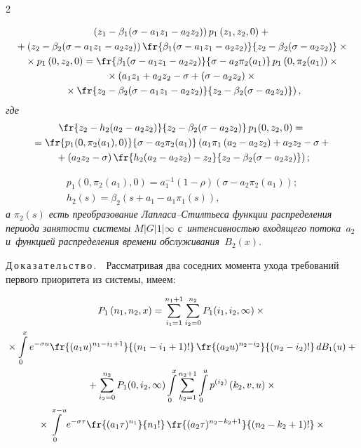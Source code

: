 \begin{multicols}{2}
\vspace*{-12pt}

\noindent
\begin{multline}
\label{n11}
\left(z_1-\beta_1(\sigma-a_1z_1-a_2z_2)\right)
p_1\left(z_1,z_2,0\right)+{}\\
{}+\left(z_2-\beta_2(\sigma-a_1z_1-a_2z_2)\right)
\fr{\beta_1(\sigma-a_1z_1-a_2z_2)}{z_2-\beta_2(\sigma-a_2z_2)}\times{}
\\
{}\times p_1\left(0,z_2,0\right)=
\fr{\beta_1(\sigma-a_1z_1-a_2z_2)}{\sigma-a_2\pi_2(a_1)}\,p_1\left(0,\pi_2(a_1)\right)\times{}\\
{}\times\left(
\vphantom{\fr{z_2-\beta_2(s+\sigma-a_1z_1-a_2z_2)}{z_2-\beta_2(s+\sigma-a_2z_2)}}
a_1z_1+a_2z_2-\sigma+\left(\sigma-a_2z_2\right)\times{}\right.\\
\left.{}\times
\fr{z_2-\beta_2(\sigma-a_1z_1-a_2z_2)}
{z_2-\beta_2(\sigma-a_2z_2)}\right),
\end{multline}
\textit{где}
\begin{multline}
\label{n12}
\fr{z_2-h_2(a_2-a_2z_2)}{z_2-\beta_2(\sigma-a_2z_2)}\,
p_1(0,z_2,0)={}\\
{}=\fr{p_1(0,\pi_2(a_1),0)}{\sigma-a_2\pi_2(a_1)}
\left(
\vphantom{\fr{z_2-\beta_2(s+\sigma-a_1z_1-a_2z_2)}{z_2-\beta_2(s+\sigma-a_2z_2)}}
a_1\pi_1\left(a_2-a_2z_2\right)+
a_2z_2-\sigma+{}\right.\\
\left.{}+\left(a_2z_2-\sigma\right)
\fr{h_2(a_2-a_2z_2)-z_2}
{z_2-\beta_2(\sigma-a_2z_2)}\right);
\end{multline}

\vspace*{-12pt}

\noindent
\begin{gather*}
p_1\left(0,\pi_2(a_1),0\right)=
a_1^{-1}(1-\rho)\left(\sigma-a_2\pi_2(a_1)\right);\\
 h_2(s)=\beta_2\left(s+a_1-a_1\pi_1(s)\right),
\end{gather*}
\textit{а $\pi_2(s)$  есть преобразование Лап\-ла\-са--Стилть\-еса функции распределения периода занятости системы $M|G|1|\infty$ с~интенсивностью входящего
потока~$a_2$ и~функцией распределения времени обслуживания~$B_2(x).$}

\smallskip

\noindent
Д\,о\,к\,а\,з\,а\,т\,е\,л\,ь\,с\,т\,в\,о\,.\ \
 Рассматривая два соседних момента ухода требований первого приоритета 
 из системы, имеем:
 
 \noindent
\begin{multline*}
P_1\left(n_1,n_2,x\right)=
\sum\limits_{i_1=1}^{n_1+1}\sum\limits_{i_2=0}^{n_2}P_1(i_1,i_2,\infty)\times{}\\
{}\times
\int\limits_0^xe^{-\sigma u}
\fr{(a_1u)^{n_1-i_1+1}}{(n_1-i_1+1)!}\,
\fr{(a_2u)^{n_2-i_2}}{(n_2-i_2)!}\,dB_1(u)+{}\\
{}+
\sum\limits_{i_2=0}^{n_2}P_1(0,i_2,\infty)\int\limits_0^x
\sum\limits_{k_2=1}^{n_2+1}\int\limits_0^u
p^{(i_2)}\left(k_2,v,u\right)\times{}\\
{}\times \int\limits_0^{x-u}e^{-\sigma\tau}
\fr{(a_1\tau)^{n_1}}{n_1!}\,
\fr{(a_2\tau)^{n_2-k_2+1}}{(n_2-k_2+1)!}\times{}
\end{multline*}


\end{multicols}
